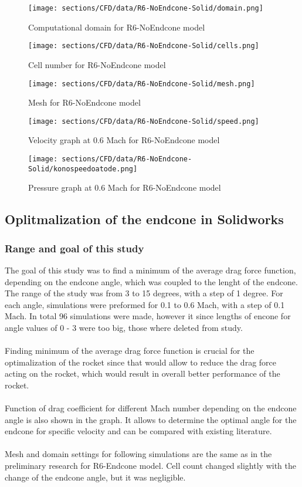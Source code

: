 \begin{figure}[H]
    \centering
    \texttt{[image: sections/CFD/data/R6-NoEndcone-Solid/domain.png]}
    \caption{Computational domain for R6-NoEndcone model}
\end{figure}
\begin{figure}[H]
    \centering
    \texttt{[image: sections/CFD/data/R6-NoEndcone-Solid/cells.png]}
    \caption{Cell number for R6-NoEndcone model}
\end{figure}

\begin{figure}[H]
    \centering
    \texttt{[image: sections/CFD/data/R6-NoEndcone-Solid/mesh.png]}
    \caption{Mesh for R6-NoEndcone model}
\end{figure}
\begin{figure}[H]
    \centering
    \texttt{[image: sections/CFD/data/R6-NoEndcone-Solid/speed.png]}
    \caption{Velocity graph at 0.6 Mach for R6-NoEndcone    model}
\end{figure}

\begin{figure}[H]
    \centering
    \texttt{[image: sections/CFD/data/R6-NoEndcone-Solid/konospeedoatode.png]}
    \caption{Pressure graph at 0.6 Mach for R6-NoEndcone model}
\end{figure}



\subsection{Oplitmalization of the endcone in Solidworks}
\subsubsection{Range and goal of this study}
The goal of this study was to find a minimum of the average drag force function, depending on
the endcone angle, which was coupled to the lenght of the endcone. The range of the
study was from 3 to 15 degrees, with a step of 1 degree. For each angle, simulations were preformed for 
0.1 to 0.6 Mach, with a step of 0.1 Mach. In total 96 simulations were made, however it since 
lengths of encone for angle values of 0 - 3 were too big, those where deleted from study.\\\\
Finding minimum of the average drag force function is crucial for the optimalization of the rocket
since that would allow to reduce the drag force acting on the rocket, which would result in
overall better performance of the rocket.\\\\
Function of drag coefficient for different Mach number depending on the endcone angle is also 
shown in the graph. It allows to determine the optimal angle for the endcone for specific
velocity and can be compared with existing literature.\\\\
Mesh and domain settings for following simulations are the same as in the preliminary research for
R6-Endcone model. Cell count changed slightly with the change of the endcone angle, but it was
negligible.

